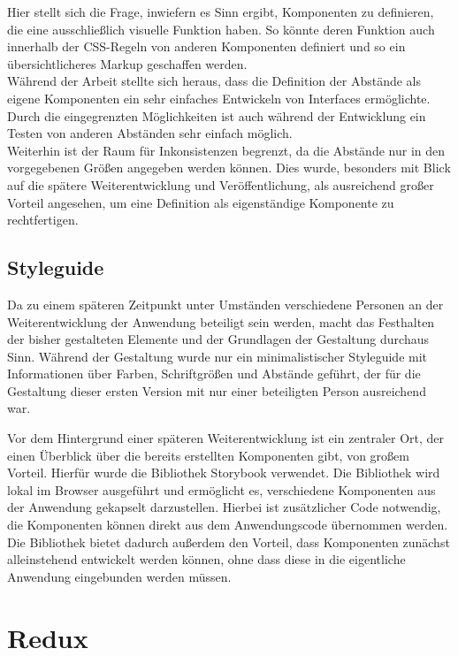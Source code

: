 Hier stellt sich die Frage, inwiefern es Sinn ergibt, Komponenten zu definieren, die eine ausschließlich visuelle Funktion haben.
So könnte deren Funktion auch innerhalb der CSS-Regeln von anderen Komponenten definiert und so ein übersichtlicheres Markup geschaffen werden.\\
Während der Arbeit stellte sich heraus, dass die Definition der Abstände als eigene Komponenten ein sehr einfaches Entwickeln von Interfaces ermöglichte. Durch die eingegrenzten Möglichkeiten ist auch während der Entwicklung ein Testen von anderen Abständen sehr einfach möglich.\\
Weiterhin ist der Raum für Inkonsistenzen begrenzt, da die Abstände nur in den vorgegebenen Größen angegeben werden können. Dies wurde, besonders mit Blick auf die spätere Weiterentwicklung und Veröffentlichung, als ausreichend großer Vorteil angesehen, um eine Definition als eigenständige Komponente zu rechtfertigen.

\subsection{Styleguide}
\label{chap:styleguide}
Da zu einem späteren Zeitpunkt unter Umständen verschiedene Personen an der Weiterentwicklung der Anwendung beteiligt sein werden, macht das Festhalten der bisher gestalteten Elemente und der Grundlagen der Gestaltung durchaus Sinn.
Während der Gestaltung wurde nur ein minimalistischer Styleguide mit Informationen über Farben, Schriftgrößen und Abstände geführt, der für die Gestaltung dieser ersten Version mit nur einer beteiligten Person ausreichend war.

Vor dem Hintergrund einer späteren Weiterentwicklung ist ein zentraler Ort, der einen Überblick über die bereits erstellten Komponenten gibt, von großem Vorteil.
Hierfür wurde die Bibliothek Storybook\footnotemark{} verwendet. Die Bibliothek wird lokal im Browser ausgeführt und ermöglicht es, verschiedene Komponenten aus der Anwendung gekapselt darzustellen. Hierbei ist zusätzlicher Code notwendig, die Komponenten können direkt aus dem Anwendungscode übernommen werden.
Die Bibliothek bietet dadurch außerdem den Vorteil, dass Komponenten zunächst alleinstehend entwickelt werden können, ohne dass diese in die eigentliche Anwendung eingebunden werden müssen.


\section{Redux}
\label{chap:redux}

